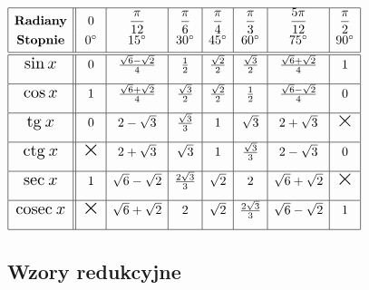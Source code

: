 \documentclass[14pt,a4paper]{extarticle}
\newcommand{\scalemath}[2][4]{\scalebox{#1}{\ensuremath{#2}}}
\begin{document}
\begin{center}
{%
\setlength\extrarowheight{10pt}

\(
\begin{array}{|c||c|c|c|c|c|c|c|}
   \hline
   \textbf{Radiany} & 0 & \dfrac{\pi}{12} & \dfrac{\pi}{6} & \dfrac{\pi}{4} & \dfrac{\pi}{3} & \dfrac{5\pi}{12} & \dfrac{\pi}{2}\\[0.1cm]
   \textbf{Stopnie} & 0^{\circ} & 15^{\circ} & 30^{\circ} & 45^{\circ} & 60^{\circ} & 75^{\circ} & 90^{\circ}\\[0.1cm]\hline\hline
   \scalemath[1.3]{\sin x} & 0 & \frac{\sqrt{6}-\sqrt{2}}{4} & \frac{1}{2} & \frac{\sqrt{2}}{2} & \frac{\sqrt{3}}{2} & \frac{\sqrt{6}+\sqrt{2}}{4} & 1 \\[0.3cm]\hline
   \scalemath[1.3]{\cos x} & 1 & \frac{\sqrt{6}+\sqrt{2}}{4} & \frac{\sqrt{3}}{2} & \frac{\sqrt{2}}{2} & \frac{1}{2} & \frac{\sqrt{6}-\sqrt{2}}{4} & 0 \\[0.3cm]\hline
   \scalemath[1.3]{\text{tg}\: x} & 0 & 2 - \sqrt{3} & \frac{\sqrt{3}}{3} & 1 & \sqrt{3} & 2 + \sqrt{3} & \scalemath[1.8]{\times} \\[0.3cm]\hline
   \scalemath[1.3]{\text{ctg}\: x} & \scalemath[1.8]{\times} & 2 + \sqrt{3} & \sqrt{3} & 1 & \frac{\sqrt{3}}{3} & 2 - \sqrt{3} & 0 \\[0.3cm]\hline
   \scalemath[1.3]{\text{sec}\: x} & 1 & \sqrt{6} - \sqrt{2} & \frac{2\sqrt{3}}{3} & \sqrt{2} & 2 & \sqrt{6} + \sqrt{2} & \scalemath[1.8]{\times} \\[0.3cm]\hline
   \scalemath[1.3]{\text{cosec}\: x} & \scalemath[1.8]{\times} & \sqrt{6} + \sqrt{2} & 2 & \sqrt{2} & \frac{2\sqrt{3}}{3} &  \sqrt{6} - \sqrt{2} & 1 \\[0.3cm]\hline
\end{array}
\)

}%
\end{center}

\subsection{Wzory redukcyjne}
\end{document}
